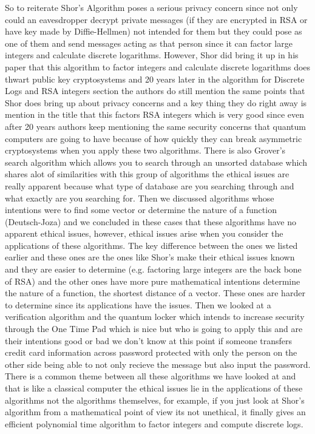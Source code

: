 \documentclass{article}
\begin{document}
So to reiterate Shor's Algorithm poses a serious privacy concern since not only could an eavesdropper decrypt private messages (if they are encrypted in RSA or have key made by Diffie-Hellmen) not intended for them but they could pose as one of them and send messages acting as that person since it can factor large integers and calculate discrete logarithms. However, Shor did bring it up in his paper that this algorithm to factor integers and calculate discrete logarithms does thwart public key cryptosystems and 20 years later in the algorithm for Discrete Logs and RSA integers section the authors do still mention the same points that Shor does bring up about privacy concerns and a key thing they do right away is mention in the title that this factors RSA integers which is very good since even after 20 years authors keep mentioning the same security concerns that quantum computers are going to have because of how quickly they can break asymmetric cryptosystems when you apply these two algorithms. There is also Grover's search algorithm which allows you to search through an unsorted database which shares alot of similarities with this group of algorithms the ethical issues are really apparent because what type of database are you searching through and what exactly are you searching for. Then we discussed algorithms whose intentions were to find some vector or determine the nature of a function (Deutsch-Joza) and we concluded in these cases that these algorithms have no apparent ethical issues, however, ethical issues arise when you consider the applications of these algorithms. The key difference between the ones we listed earlier and these ones are the ones like Shor's make their ethical issues known and they are easier to determine (e.g. factoring large integers are the back bone of RSA)  and the other ones have more pure mathematical intentions determine the nature of a function, the shortest distance of a vector. These ones are harder to determine since its applications have the issues. Then we looked at a verification algorithm and the quantum locker which intends to increase security through the One Time Pad which is nice but who is going to apply this and are their intentions good or bad we don't know at this point if someone transfers credit card information across password protected with only the person on the other side being able to not only recieve the message but also input the password. There is a common theme between all these algorithms we have looked at and that is like a classical computer the ethical issues lie in the applications of these algorithms not the algorithms themselves, for example, if you just look at Shor's algorithm from a mathematical point of view its not unethical, it finally gives an efficient polynomial time algorithm to factor integers and compute discrete logs.  
\end{document}
